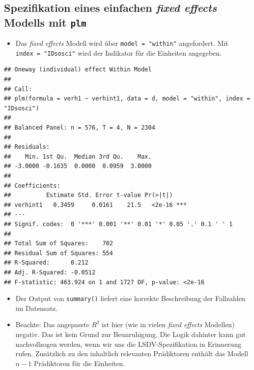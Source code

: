 \documentclass[
]{book}
\newenvironment{Shaded}{\begin{snugshade}}{\end{snugshade}}
\newcommand{\DataTypeTok}[1]{\textcolor[rgb]{0.13,0.29,0.53}{#1}}
\newcommand{\KeywordTok}[1]{\textcolor[rgb]{0.13,0.29,0.53}{\textbf{#1}}}
\newcommand{\NormalTok}[1]{#1}
\newcommand{\OperatorTok}[1]{\textcolor[rgb]{0.81,0.36,0.00}{\textbf{#1}}}
\newcommand{\StringTok}[1]{\textcolor[rgb]{0.31,0.60,0.02}{#1}}
\providecommand{\tightlist}{%
  \setlength{\itemsep}{0pt}\setlength{\parskip}{0pt}}
\begin{document}
\hypertarget{spezifikation-eines-einfachen-fixed-effects-modells-mit-plm}{%
\subsection*{\texorpdfstring{Spezifikation eines einfachen \emph{fixed effects} Modells mit \texttt{plm}}{Spezifikation eines einfachen fixed effects Modells mit plm}}\label{spezifikation-eines-einfachen-fixed-effects-modells-mit-plm}}

\begin{itemize}
\tightlist
\item
  Das \emph{fixed effects} Modell wird über \texttt{model\ =\ "within"} angefordert. Mit \texttt{index\ =\ "IDsosci"} wird der Indikator für die Einheiten angegeben.
\end{itemize}

\begin{Shaded}
\end{Shaded}

\begin{verbatim}
## Oneway (individual) effect Within Model
## 
## Call:
## plm(formula = verh1 ~ verhint1, data = d, model = "within", index = "IDsosci")
## 
## Balanced Panel: n = 576, T = 4, N = 2304
## 
## Residuals:
##    Min. 1st Qu.  Median 3rd Qu.    Max. 
## -3.0000 -0.1635  0.0000  0.0959  3.0000 
## 
## Coefficients:
##          Estimate Std. Error t-value Pr(>|t|)    
## verhint1   0.3459     0.0161    21.5   <2e-16 ***
## ---
## Signif. codes:  0 '***' 0.001 '**' 0.01 '*' 0.05 '.' 0.1 ' ' 1
## 
## Total Sum of Squares:    702
## Residual Sum of Squares: 554
## R-Squared:      0.212
## Adj. R-Squared: -0.0512
## F-statistic: 463.924 on 1 and 1727 DF, p-value: <2e-16
\end{verbatim}

\begin{itemize}
\tightlist
\item
  Der Output von \texttt{summary()} liefert eine korrekte Beschreibung der Fallzahlen im Datensatz.
\item
  Beachte: Das angepasste \(R^2\) ist hier (wie in vielen \emph{fixed effects} Modellen) negativ. Das ist kein Grund zur Beunruhigung. Die Logik dahinter kann gut nachvollzogen werden, wenn wir uns die LSDV-Spezifikation in Erinnerung rufen. Zusätzlich zu den inhaltlich relevanten Prädiktoren enthält das Modell \(n - 1\) Prädiktoren für die Einheiten.
\end{itemize}
\end{document}

